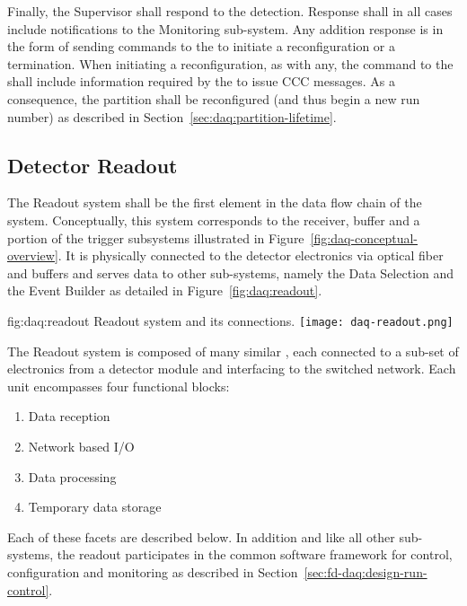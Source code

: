 Finally, the Supervisor shall respond to the detection. 
Response shall in all cases include notifications to the Monitoring sub-system. 
Any addition response is in the form of sending commands to the  to initiate a reconfiguration or a termination. 
When initiating a reconfiguration, as with any, the command to the  shall include information required by the  to issue CCC messages. 
As a consequence, the partition shall be reconfigured (and thus begin a new run number) as described in Section~\ref{sec:daq:partition-lifetime}.


\subsection{Detector Readout}
\label{sec:fd-daq:readout}

The Readout system shall be the first  element in the data flow chain of the  system.
Conceptually, this system corresponds to the receiver, buffer and a portion of the trigger subsystems illustrated in Figure~\ref{fig:daq-conceptual-overview}.
It is physically connected to the detector electronics via optical fiber and buffers and serves data to other  sub-systems, namely the Data Selection and the Event Builder as detailed in Figure~\ref{fig:daq:readout}.

\begin{dunefigure}{fig:daq:readout}{  Readout system and its connections.}
  \texttt{[image: daq-readout.png]}
\end{dunefigure}

The Readout system is composed of many similar , each connected to a sub-set of electronics from a detector module and interfacing to the  switched network.  Each unit encompasses four functional blocks:

\begin{enumerate}
\item Data reception
\item Network based I/O
\item Data processing
\item Temporary data storage
\end{enumerate}

Each of these facets are described below.  In addition and like all other  sub-systems, the readout participates in the common software framework for control, configuration and monitoring as described in Section~\ref{sec:fd-daq:design-run-control}.

